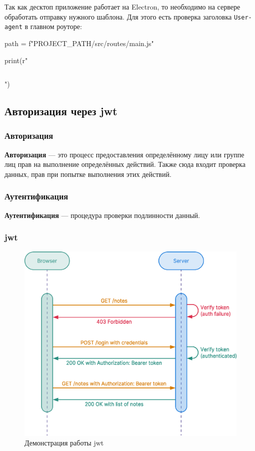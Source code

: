 Так как десктоп приложение работает на Electron, то необходимо на сервере обработать отправку нужного шаблона. Для этого есть проверка заголовка \texttt{User-agent} в главном роуторе:

\begin{pycode}
path = f"{PROJECT_PATH}/src/routes/main.js"

print(r"\inputminted{js}{" + path + r"}")
\end{pycode}

\subsection{Авторизация через \acrfull{jwt}}

\subsubsection{Авторизация}
\textbf{Авторизация} --- это процесс предоставления определённому лицу или группе лиц прав на выполнение определённых действий. Также сюда входит проверка данных, прав при попытке выполнения этих действий.

\subsubsection{Аутентификация}
\textbf{Аутентификация} --- процедура проверки подлинности данный.

\subsubsection{\acrfull{jwt}}
\begin{figure}[h!]
    \begin{center}
        \includegraphics[scale=0.4]{images/jwt-example.eps}
        \caption{Демонстрация работы \acrshort{jwt}}
    \end{center}
\end{figure}


